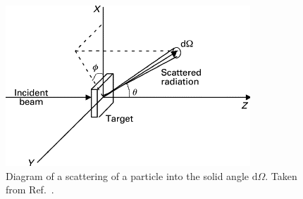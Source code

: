 \FloatBarrier
\begin{figure}[ht]
    \centering
    \includegraphics{figures/cs.png}
    \caption[Diagram of a scattering of a particle]{Diagram of a scattering of a particle into the solid angle $\mathrm{d}\Omega$. Taken from Ref.~\cite{cs}.}
    \label{tf32}
\end{figure}

